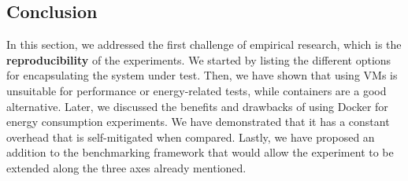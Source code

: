 \subsection{Conclusion}

In this section, we addressed the first challenge of empirical research, which is the \textbf{reproducibility} of the experiments.
We started by listing the different options for encapsulating the system under test.
Then, we have shown that using VMs is unsuitable for performance or energy-related tests, while containers are a good alternative. Later, we discussed the benefits and drawbacks of using Docker for energy consumption experiments. We have demonstrated that it has a constant overhead that is self-mitigated when compared.
Lastly, we have proposed an addition to the benchmarking framework that would allow the experiment to be extended along the three axes already mentioned.



\clearpage